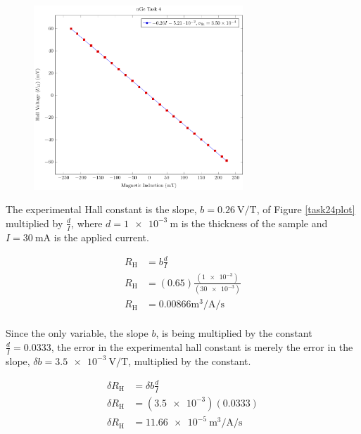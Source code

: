 \documentclass[a4paper]{article}
\begin{document}
\begin{figure}[H]
\centering
\includegraphics[width=0.7\textwidth]{NGePlots/Task4/nGeTask4.pdf}
\label{task34plot}
\end{figure}

\qq The experimental Hall constant is the slope, \( b =
\SI{0.26}{\volt\per\tesla} \), of Figure \ref{task24plot}
multiplied by \( \frac{d}{I} \), where \( d = \SI{1e-3}{\meter} \) is the
thickness of the sample and \( I = \SI{30}{\milli\ampere} \) is the applied
current. 

\begin{align*}
  R_{\text{H}} &= b \frac{d}{I} \\
  R_{\text{H}} &= (0.65) \frac{(\num{1e-3})}{(\num{30e-3})} \\
  R_{\text{H}} &= \num{0.00866}\si{\cubic\meter\per\ampere\per\second} \\
\end{align*}

\qq Since the only variable, the slope \( b \), is being multiplied by the constant
\( \frac{d}{I} = \num{0.0333} \), the error in the experimental hall constant is
merely the error in the slope, \( \delta b = \SI{3.5e-3}{\volt\per\tesla} \),
multiplied by the constant.

\begin{align*}
  \delta R_{\text{H}} &= \delta b \frac{d}{I} \\
  \delta R_{\text{H}} &= (\num{3.5e-3}) (\num{0.0333}) \\
  \delta R_{\text{H}} &= \SI{11.66e-5}{\cubic\meter\per\ampere\per\second} \\
\end{align*}
\end{document}
